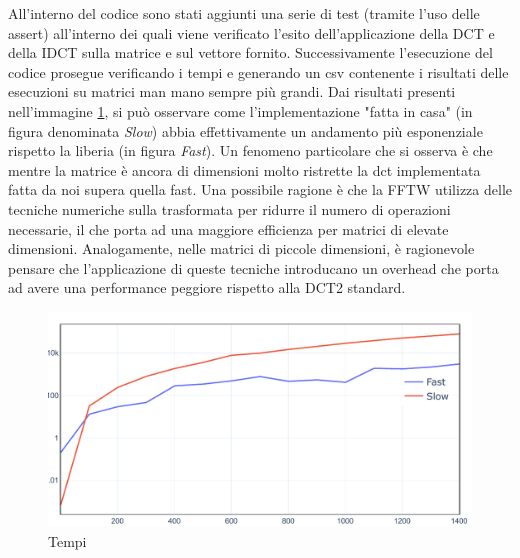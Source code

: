All'interno del codice sono stati aggiunti una serie di test (tramite l'uso delle assert) all'interno dei quali viene verificato l'esito dell'applicazione della DCT e della IDCT sulla matrice e sul vettore fornito. Successivamente l'esecuzione del codice prosegue verificando i tempi e generando un csv contenente i risultati delle esecuzioni su matrici man mano sempre più grandi. Dai risultati presenti nell'immagine \ref{fig:timings}, si può osservare come l'implementazione "fatta in casa" (in figura denominata \textit{Slow}) abbia effettivamente un andamento più esponenziale rispetto la liberia (in figura \textit{Fast}). Un fenomeno particolare che si osserva è che mentre la matrice è ancora di dimensioni molto ristrette la dct implementata fatta da noi supera quella fast. Una possibile ragione è che la FFTW utilizza delle tecniche numeriche sulla trasformata per ridurre il numero di operazioni necessarie, il che porta ad una maggiore efficienza per matrici di elevate dimensioni. Analogamente, nelle matrici di piccole dimensioni, è ragionevole pensare che l'applicazione di queste tecniche introducano un overhead che porta ad avere una performance peggiore rispetto alla DCT2 standard.

\begin{figure}[ht]
	\centering
	\includegraphics[scale=0.7]{figures/timings}
	\caption{Tempi}
	\label{fig:timings}	
\end{figure}

\FloatBarrier